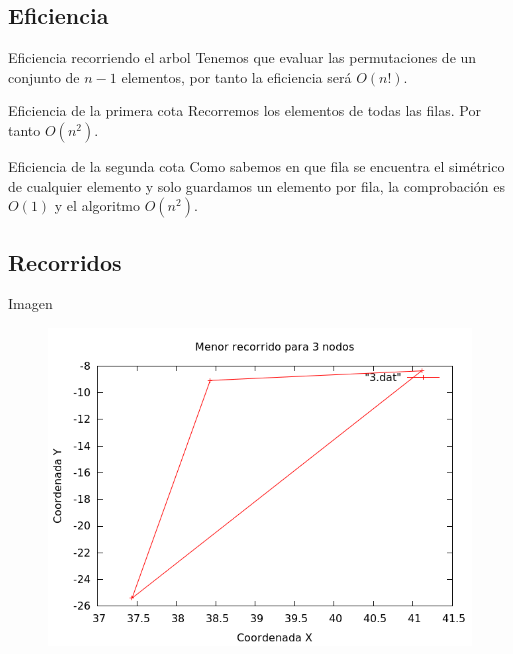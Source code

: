 \subsection{Eficiencia}
\begin{frame}
	\begin{block}{Eficiencia recorriendo el arbol}
	Tenemos que evaluar las permutaciones de un conjunto de $n-1$ elementos, por tanto la eficiencia será $O(n!)$.
	\end{block}
	
	\begin{block}{Eficiencia de la primera cota}
		Recorremos los elementos de todas las filas. Por tanto $O(n^2)$.
	\end{block}
	
	\begin{block}{Eficiencia de la segunda cota}
		Como sabemos en que fila se encuentra el simétrico de cualquier elemento y solo guardamos un elemento por fila, la comprobación es $O(1)$ y el algoritmo $O(n^2)$.
	\end{block}

\end{frame}





\subsection{Recorridos}

\begin{frame}
	\begin{exampleblock}{Imagen}
	\begin{figure}[H]
    	\centering
    	\includegraphics[scale=0.35]{../TSP/Graficas/3.png}
	\end{figure}
	\end{exampleblock}
\end{frame}

